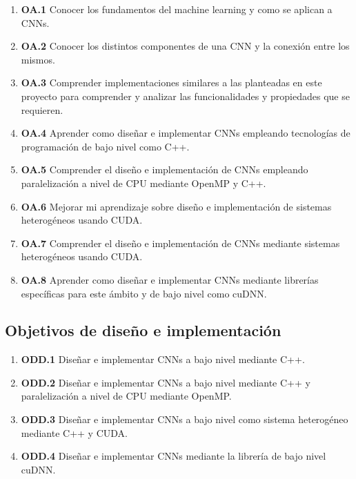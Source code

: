 \begin{enumerate}[label=\textbullet]
	\item \textbf{OA.1} Conocer los fundamentos del machine learning y como se aplican a CNNs.
	
	\item \textbf{OA.2} Conocer los distintos componentes de una CNN y la conexión entre los mismos.
	
	\item \textbf{OA.3} Comprender implementaciones similares a las planteadas en este proyecto para comprender y analizar las funcionalidades y propiedades que se requieren. 
	
	\item \textbf{OA.4} Aprender como diseñar e implementar CNNs empleando tecnologías de programación de bajo nivel como C++.
	
	\item \textbf{OA.5} Comprender el diseño e implementación de CNNs empleando paralelización a nivel de CPU mediante OpenMP y C++.
	
	\item \textbf{OA.6} Mejorar mi aprendizaje sobre diseño e implementación de sistemas heterogéneos usando CUDA.

	\item \textbf{OA.7} Comprender el diseño e implementación de CNNs mediante sistemas heterogéneos usando CUDA.

	\item \textbf{OA.8} Aprender como diseñar e implementar CNNs mediante librerías específicas para este ámbito y de bajo nivel como cuDNN.

\end{enumerate}

\subsection{Objetivos de diseño e implementación}

\begin{enumerate}[label=\textbullet]
	\item \textbf{ODD.1} Diseñar e implementar CNNs a bajo nivel mediante C++.
	
	\item \textbf{ODD.2} Diseñar e implementar CNNs a bajo nivel mediante C++ y paralelización a nivel de CPU mediante OpenMP.

	\item \textbf{ODD.3} Diseñar e implementar CNNs a bajo nivel como sistema heterogéneo mediante C++ y CUDA.

	\item \textbf{ODD.4} Diseñar e implementar CNNs mediante la librería de bajo nivel cuDNN.		
	
\end{enumerate}

